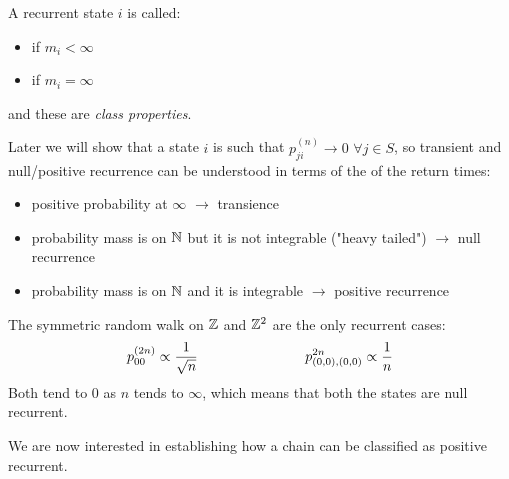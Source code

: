 \documentclass{article}
\begin{document}
\begin{definition}
    A recurrent state $i$ is called:
    \begin{itemize}
        \item {} if $m_i<\infty$
        \item {} if $m_i=\infty$
    \end{itemize}
    and these are \textit{class properties}.
\end{definition}
Later we will show that a  state $i$ is such that $p_{ji}^{(n)}\rightarrow 0$ $\forall j\in S$, so transient and null/positive recurrence can be understood in terms of the  of the return times:
\begin{itemize}[-]
    \item positive probability at $\infty$ $\rightarrow$ transience
    \item probability mass is on $\mathbb{N}$ but it is not integrable ("heavy tailed") $\rightarrow$ null recurrence
    \item probability mass is on $\mathbb{N}$ and it is integrable $\rightarrow$ positive recurrence
\end{itemize}
\begin{example}
    The symmetric random walk on $\mathbb{Z}$ and $\mathbb{Z}^2$ are the only recurrent cases:
    \[p_{00}^{(2n)}\propto\frac{1}{\sqrt{n}} \hspace{2.7cm} p_{(0,0),(0,0)}^{2n}\propto\frac{1}{n} \]
    Both tend to 0 as $n$ tends to $\infty$, which means that both the states are null recurrent.
\end{example}
We are now interested in establishing how a chain can be classified as positive recurrent.
\end{document}
